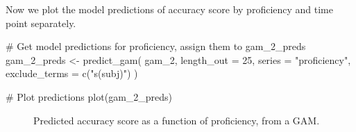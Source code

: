 \documentclass[
  letterpaper,
  DIV=11,
  numbers=noendperiod]{scrartcl}
\newenvironment{Shaded}{\begin{snugshade}}{\end{snugshade}}
\newcommand{\AttributeTok}[1]{\textcolor[rgb]{0.40,0.45,0.13}{#1}}
\newcommand{\CommentTok}[1]{\textcolor[rgb]{0.37,0.37,0.37}{#1}}
\newcommand{\DecValTok}[1]{\textcolor[rgb]{0.68,0.00,0.00}{#1}}
\newcommand{\FunctionTok}[1]{\textcolor[rgb]{0.28,0.35,0.67}{#1}}
\newcommand{\NormalTok}[1]{\textcolor[rgb]{0.00,0.23,0.31}{#1}}
\newcommand{\OtherTok}[1]{\textcolor[rgb]{0.00,0.23,0.31}{#1}}
\newcommand{\StringTok}[1]{\textcolor[rgb]{0.13,0.47,0.30}{#1}}
\begin{document}
Now we plot the model predictions of accuracy score by proficiency and
time point separately.

\begin{Shaded}
\begin{Highlighting}[]
\CommentTok{\# Get model predictions for \textquotesingle{}proficiency\textquotesingle{}, assign them to \textquotesingle{}gam\_2\_preds\textquotesingle{}}
\NormalTok{gam\_2\_preds }\OtherTok{\textless{}{-}} \FunctionTok{predict\_gam}\NormalTok{(}
\NormalTok{  gam\_2, }\AttributeTok{length\_out =} \DecValTok{25}\NormalTok{,}
  \AttributeTok{series =} \StringTok{"proficiency"}\NormalTok{,}
  \AttributeTok{exclude\_terms =} \FunctionTok{c}\NormalTok{(}\StringTok{"s(subj)"}\NormalTok{)}
\NormalTok{)}
\end{Highlighting}
\end{Shaded}

\begin{Shaded}
\begin{Highlighting}[]
\CommentTok{\# Plot predictions}
\FunctionTok{plot}\NormalTok{(gam\_2\_preds)}
\end{Highlighting}
\end{Shaded}

\begin{figure}[H]


\caption{\label{fig-gam-2-preds}Predicted accuracy score as a function
of proficiency, from a GAM.}

\end{figure}%
\end{document}

